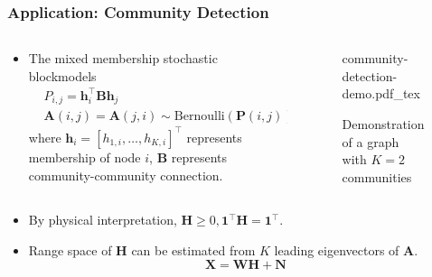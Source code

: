 \documentclass[10pt,xcolor={usenames,dvipsnames,table}]{beamer}
\def\red{\color{red}}
\def\blue{\color{blue}}
\newcommand{\T}{\!\top\!}
\newcommand{\incfig}[2][1]{%
    \def\svgwidth{#1\columnwidth}
    {#2.pdf_tex}
}
\newcommand{\citep}[1]{{\blue \scriptsize \parencite{#1}}}
\begin{document}
\begin{frame}
    \frametitle{Application: Community Detection}
    \begin{columns}
        \begin{column}{0.7\textwidth}
    \begin{itemize}
        \item The mixed membership stochastic blockmodels \citep{airoldi2008mixed}
    \begin{align*}
    &P_{i,j} = \bm{h}_i^{\T} \bm{B} \bm{h}_j \\
    & \bm{A}(i,j) = \bm{A}(j, i) \sim \text{Bernoulli}(\bm{P}(i, j))
    \end{align*} 
    where $\bm{h}_i= [h_{1,i}, \ldots , h_{K, i}]^{\T}$ represents membership of node $i$, $\bm{B}$ represents community-community connection.
    \end{itemize}
        \end{column}
        \begin{column}{0.3\textwidth}
        \begin{figure}
            \centering
    \resizebox{\textwidth}{!}
            { 
            \incfig{community-detection-demo} }
            \caption*{Demonstration of a graph with $K=2$ communities}
        \end{figure}
        \end{column}
    \end{columns}

    \begin{columns}
        \begin{column}{1.\textwidth}
    \begin{itemize}
    \item By physical interpretation, $\bm{H} \geq 0, \bm{1}^{\T}\bm{H}=\bm{1}^{\T}$.
    \item Range space of $\bm{H}$ can be estimated from $K$ leading eigenvectors of  $\bm{A}$.
        \citep{mao2017mixed,mao2017estimating,panov2018consistent,lei2015consistency}  
        \[
        \bm{X} = \bm{W} \bm{H} + \bm{N}
        \] 
    \end{itemize}
        \end{column}
    \end{columns}
\end{frame}
\end{document}
